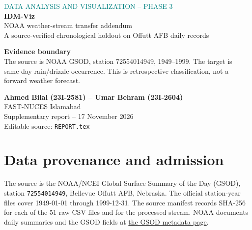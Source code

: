 \documentclass[10pt,a4paper]{article}
\begin{document}
\begin{titlepage}\color{ink}\vspace*{15mm}
{\large\textcolor{teal}{DATA ANALYSIS AND VISUALIZATION -- PHASE 3}}\\[18mm]
{\Huge\bfseries IDM-Viz}\\[4mm]
{\LARGE NOAA weather-stream transfer addendum}\\[7mm]
{\large A source-verified chronological holdout on Offutt AFB daily records}\\[18mm]
\begin{tcolorbox}[colback=mist,colframe=teal,boxrule=0pt,leftrule=2mm]
\textbf{Evidence boundary}\\
The source is NOAA GSOD, station 72554014949, 1949--1999. The target is same-day rain/drizzle occurrence. This is retrospective classification, not a forward weather forecast.
\end{tcolorbox}
\vfill\textbf{Ahmed Bilal (23I-2581) -- Umar Behram (23I-2604)}\\
FAST-NUCES Islamabad\\[4mm]
Supplementary report -- 17 November 2026\\Editable source: \texttt{REPORT.tex}
\end{titlepage}
\begin{abstract}
This supplement adds a checksum-verified NOAA natural-stream exercise to the controlled IDM-Viz evaluation. A frozen logistic classifier, historical-only scaler/PCA/clusters and isotonic correctness map are fitted on chronological training, calibration and reference segments. The monitoring segment is scored in 21 complete batches of 500 days; 426 remaining rows are disclosed and excluded. Delay-zero labels are replayed only after each batch's scores are persisted. Results are descriptive for one station and one temporal split. They do not identify drift onset, forecast future rainfall, or establish general transfer.
\end{abstract}
\section{Data provenance and admission}
The source is the NOAA/NCEI Global Surface Summary of the Day (GSOD), station \texttt{72554014949}, Bellevue Offutt AFB, Nebraska. The official station-year files cover 1949-01-01 through 1999-12-31. The source manifest records SHA-256 for each of the 51 raw CSV files and for the processed stream. NOAA documents daily summaries and the GSOD fields at \href{https://www.ncei.noaa.gov/metadata/geoportal/rest/metadata/item/gov.noaa.ncdc:C00516/html}{the GSOD metadata page}.
\end{document}
